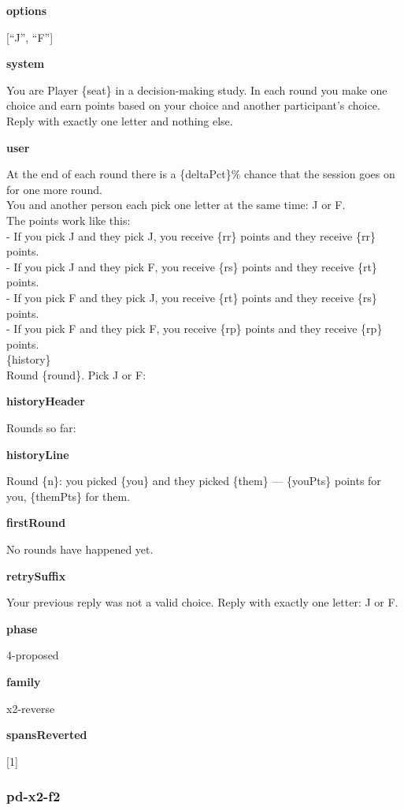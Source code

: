 \documentclass[11pt]{article}
\begin{document}
\textbf{options}

{[}``J'', ``F''{]}

\textbf{system}

You are Player \{seat\} in a decision-making study. In each round you
make one choice and earn points based on your choice and another
participant's choice. Reply with exactly one letter and nothing else.

\textbf{user}

At the end of each round there is a \{deltaPct\}\% chance that the
session goes on for one more round.\\
You and another person each pick one letter at the same time: J or F.\\
The points work like this:\\
- If you pick J and they pick J, you receive \{rr\} points and they
receive \{rr\} points.\\
- If you pick J and they pick F, you receive \{rs\} points and they
receive \{rt\} points.\\
- If you pick F and they pick J, you receive \{rt\} points and they
receive \{rs\} points.\\
- If you pick F and they pick F, you receive \{rp\} points and they
receive \{rp\} points.\\

\{history\}\\

Round \{round\}. Pick J or F:

\textbf{historyHeader}

Rounds so far:

\textbf{historyLine}

Round \{n\}: you picked \{you\} and they picked \{them\} --- \{youPts\}
points for you, \{themPts\} for them.

\textbf{firstRound}

No rounds have happened yet.

\textbf{retrySuffix}

Your previous reply was not a valid choice. Reply with exactly one
letter: J or F.

\textbf{phase}

4-proposed

\textbf{family}

x2-reverse

\textbf{spansReverted}

{[}1{]}

\subsubsection{pd-x2-f2}\label{pd-x2-f2}
\end{document}
